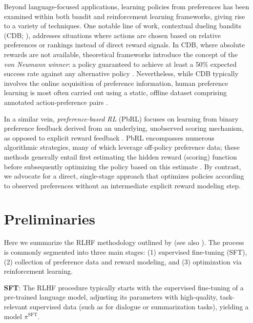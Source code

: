 Beyond language-focused applications, learning policies from preferences has been examined within both bandit and reinforcement learning frameworks, giving rise to a variety of techniques. One notable line of work, contextual dueling bandits (CDB; \cite{yue2012karmed,dudik2015contextual}), addresses situations where actions are chosen based on relative preferences or rankings instead of direct reward signals. In CDB, where absolute rewards are not available, theoretical frameworks introduce the concept of the \textit{von Neumann winner}: a policy guaranteed to achieve at least a 50\% expected success rate against any alternative policy \citep{dudik2015contextual}. Nevertheless, while CDB typically involves the online acquisition of preference information, human preference learning is most often carried out using a static, offline dataset comprising annotated action-preference pairs \citep{yan2022human}. 

In a similar vein, \textit{preference-based RL} (PbRL) focuses on learning from binary preference feedback derived from an underlying, unobserved scoring mechanism, as opposed to explicit reward feedback \citep{BusaFekete2014,ruiz2023dueling}. PbRL encompasses numerous algorithmic strategies, many of which leverage off-policy preference data; these methods generally entail first estimating the hidden reward (scoring) function before subsequently optimizing the policy based on this estimate \citep{jain2013learning,BusaFekete2014,christiano2017deep,sadigh2017active,kupcsik2018learning}. By contrast, we advocate for a direct, single-stage approach that optimizes policies according to observed preferences without an intermediate explicit reward modeling step.

\section{Preliminaries}\label{section:prelims}

Here we summarize the RLHF methodology outlined by \citeauthor{ziegler2020finetuning} (see also \citep{stiennon2022learning, bai2022training, ouyang2022training}). The process is commonly segmented into three main stages: (1) supervised fine-tuning (SFT), (2) collection of preference data and reward modeling, and (3) optimization via reinforcement learning.

\textbf{SFT}: The RLHF procedure typically starts with the supervised fine-tuning of a pre-trained language model, adjusting its parameters with high-quality, task-relevant supervised data (such as for dialogue or summarization tasks), yielding a model $\pi^\text{SFT}$.

